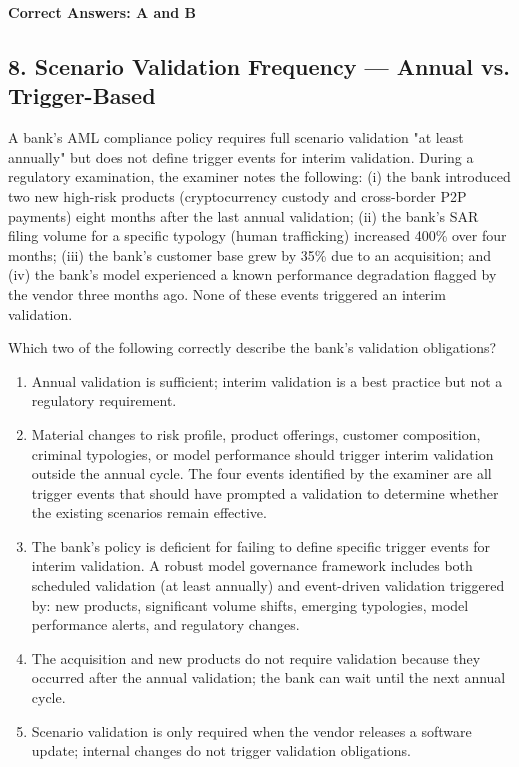 \documentclass[11pt,a4paper]{article}
\begin{document}
	\textbf{Correct Answers: A and B}
	
	\subsection{8. Scenario Validation Frequency — Annual vs. Trigger-Based}
	
	A bank's AML compliance policy requires full scenario validation "at least annually" but does not define trigger events for interim validation. During a regulatory examination, the examiner notes the following: (i) the bank introduced two new high-risk products (cryptocurrency custody and cross-border P2P payments) eight months after the last annual validation; (ii) the bank's SAR filing volume for a specific typology (human trafficking) increased 400\% over four months; (iii) the bank's customer base grew by 35\% due to an acquisition; and (iv) the bank's model experienced a known performance degradation flagged by the vendor three months ago. None of these events triggered an interim validation.
	
	Which two of the following correctly describe the bank's validation obligations?
	
	\begin{enumerate}[label=\Alph*.]
		\item Annual validation is sufficient; interim validation is a best practice but not a regulatory requirement.
		\item Material changes to risk profile, product offerings, customer composition, criminal typologies, or model performance should trigger interim validation outside the annual cycle. The four events identified by the examiner are all trigger events that should have prompted a validation to determine whether the existing scenarios remain effective.
		\item The bank's policy is deficient for failing to define specific trigger events for interim validation. A robust model governance framework includes both scheduled validation (at least annually) and event-driven validation triggered by: new products, significant volume shifts, emerging typologies, model performance alerts, and regulatory changes.
		\item The acquisition and new products do not require validation because they occurred after the annual validation; the bank can wait until the next annual cycle.
		\item Scenario validation is only required when the vendor releases a software update; internal changes do not trigger validation obligations.
	\end{enumerate}
	
\end{document}
